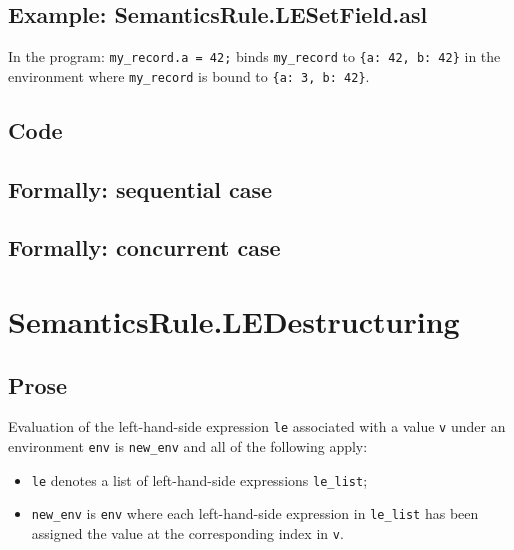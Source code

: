 \documentclass{book}
\begin{document}
    \subsection{Example: SemanticsRule.LESetField.asl}
    In the program:
    \texttt{my\_record.a = 42;} binds \texttt{my\_record} to \texttt{\{a: 42, b: 42\}} in the environment where \texttt{my\_record} is bound to \texttt{\{a: 3, b: 42\}}.

  \subsection{Code}

\begin{emptyformal}
  \subsection{Formally: sequential case}

  \subsection{Formally: concurrent case}
\end{emptyformal}


\section{SemanticsRule.LEDestructuring \label{sec:SemanticsRule.LEDestructuring}}

    \subsection{Prose}
    Evaluation of the left-hand-side expression \texttt{le} associated with a
value \texttt{v} under an environment \texttt{env} is \texttt{new\_env} and all
of the following apply:
    \begin{itemize}
    \item \texttt{le} denotes a list of left-hand-side expressions \texttt{le\_list};
    \item \texttt{new\_env} is \texttt{env} where each left-hand-side expression in \texttt{le\_list} has
      been assigned the value at the corresponding index in \texttt{v}.
    \end{itemize}
\end{document}
